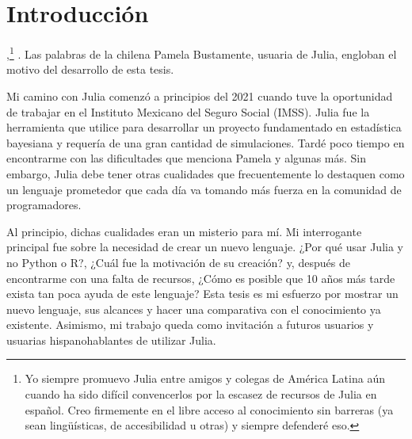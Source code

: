 \chapter{Introducción}

\textit{},\footnote{Yo siempre promuevo Julia entre amigos y colegas de América Latina aún cuando ha sido difícil convencerlos por la escasez de recursos de Julia en español. Creo firmemente en el libre acceso al conocimiento sin barreras (ya sean lingüísticas, de accesibilidad u otras) y siempre defenderé eso.} \cite{articulo_10anos}. Las palabras de la chilena Pamela Bustamente, usuaria de \textsf{Julia},  engloban el motivo del desarrollo de esta tesis.  

Mi camino con \textsf{Julia} comenzó a principios del 2021 cuando tuve la oportunidad de trabajar en el Instituto Mexicano del Seguro Social (IMSS). \textsf{Julia} fue la herramienta que utilice para desarrollar un proyecto fundamentado en estadística bayesiana y requería de una gran cantidad de simulaciones. Tardé poco tiempo en encontrarme con las dificultades que menciona Pamela y algunas más. Sin embargo, \textsf{Julia} debe tener otras cualidades que frecuentemente lo destaquen como un lenguaje prometedor que cada día va tomando más fuerza en la comunidad de programadores. 

Al principio, dichas cualidades eran un misterio para mí. Mi interrogante principal fue sobre la necesidad de crear un nuevo lenguaje. ¿Por qué usar \textsf{Julia} y no \textsf{Python} o \textsf{R}?, ¿Cuál fue la motivación de su creación? y, después de encontrarme con una falta de recursos, ¿Cómo es posible que 10 años más tarde exista tan poca ayuda de este lenguaje?  Esta tesis es mi esfuerzo por mostrar un nuevo lenguaje, sus alcances y hacer una comparativa con el conocimiento ya existente. Asimismo, mi trabajo queda como invitación a futuros usuarios y usuarias hispanohablantes de utilizar \textsf{Julia}.

